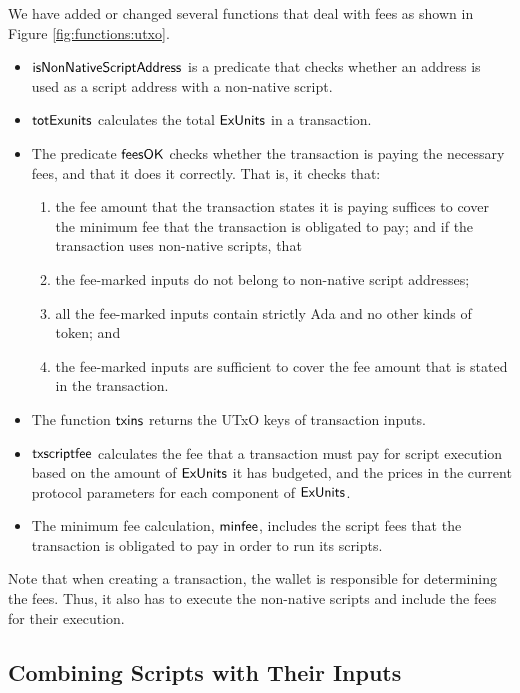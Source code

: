 We have added or changed several functions that deal with fees as shown in Figure \ref{fig:functions:utxo}.

\begin{itemize}
  \item $\mathsf{isNonNativeScriptAddress}$ is a predicate that checks
  whether an address is used as a script address with a non-native
  script.
  \item $\mathsf{totExunits}$ calculates the total $\mathsf{ExUnits}$ in a transaction.
  \item The predicate $\mathsf{feesOK}$ checks whether the transaction is
  paying the necessary fees, and that it does it correctly. That is, it checks that:
  \begin{enumerate}[label=({\roman*})]
    \item the fee amount that the transaction states it is paying suffices to cover
    the minimum fee that the transaction is obligated to pay; and if the transaction uses non-native scripts, that
    \item the fee-marked inputs do not belong to non-native script addresses;
    \item all the fee-marked inputs contain strictly Ada and no other kinds of token; and
    \item the fee-marked inputs are sufficient to cover the fee amount that is stated
    in the transaction.
  \end{enumerate}
  \item The function $\mathsf{txins}$ returns the UTxO keys of transaction inputs.
  \item $\mathsf{txscriptfee}$ calculates the fee that a transaction must pay for script
  execution based on the amount of $\mathsf{ExUnits}$ it has budgeted, and the prices in the current protocol parameters
  for each component of $\mathsf{ExUnits}$.
  \item The minimum fee calculation, $\mathsf{minfee}$, includes the script
  fees that the transaction is obligated to pay in order to run its scripts.
\end{itemize}

Note that when creating a transaction, the wallet is responsible for
determining the fees. Thus, it also has to execute the non-native scripts
and include the fees for their execution.

\subsection{Combining Scripts with Their Inputs}
\label{sec:scripts-inputs}

